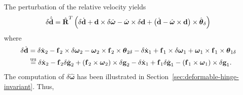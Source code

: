 \documentclass[10pt,dvips,fleqn,subeqn]{report}
\newcommand{\T}[1]{\bm{\mathbf{#1}}}
\newcommand{\TT}[1]{\bm{\mathbf{#1}}}
\newcommand{\equu}{\overset{\text{uu}}{=}}
\begin{document}
The perturbation of the relative velocity yields
\begin{equation}
	\delta\dot{\tilde{\T{d}}} = \hat{\TT{R}}^T \plbr{
		\delta\dot{\T{d}}
		+ \T{d} \times \delta\hat{\T{\omega}}
		- \hat{\T{\omega}} \times \delta\T{d}
		+ \plbr{\dot{\T{d}} - \hat{\T{\omega}} \times \T{d}} \times \hat{\T{\theta}}_{\delta}
	}
\end{equation}
where
\begin{align}
	\delta\dot{\T{d}}
	&=
	\delta\dot{\T{x}}_2
	- \T{f}_2 \times \delta\T{\omega}_{2}
	- \T{\omega}_{2} \times \T{f}_2 \times \T{\theta}_{2\delta}
	- \delta\dot{\T{x}}_1
	+ \T{f}_1 \times \delta\T{\omega}_{1}
	+ \T{\omega}_{1} \times \T{f}_1 \times \T{\theta}_{1\delta}
	\nonumber \\
	&\equu
	\delta\dot{\T{x}}_2
	- \T{f}_2 \delta\dot{\T{g}}_2
	+ \plbr{\T{f}_2\times\T{\omega}_2}\times\delta\T{g}_2
	- \delta\dot{\T{x}}_1
	+ \T{f}_1 \delta\dot{\T{g}}_1
	- \plbr{\T{f}_1\times\T{\omega}_1}\times\delta\T{g}_1
	.
\end{align}
The computation of $\delta\hat{\T{\omega}}$ has been illustrated
in Section~\ref{sec:deformable-hinge-invariant}.
Thus,
\end{document}

